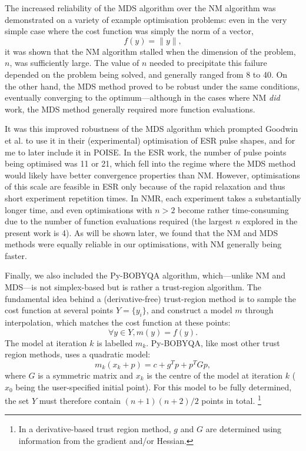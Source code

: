 The increased reliability of the MDS algorithm over the NM algorithm was demonstrated on a variety of example optimisation problems: even in the very simple case where the cost function was simply the norm of a vector,
\begin{equation}
    \label{eq:norm_cf}
    f(y) = \lVert y \rVert,
\end{equation}
it was shown that the NM algorithm stalled when the dimension of the problem, $n$, was sufficiently large.
The value of $n$ needed to precipitate this failure depended on the problem being solved, and generally ranged from 8 to 40.
On the other hand, the MDS method proved to be robust under the same conditions, eventually converging to the optimum---although in the cases where NM \textit{did} work, the MDS method generally required more function evaluations.

It was this improved robustness of the MDS algorithm which prompted Goodwin et al.\autocite{Goodwin2018JMR} to use it in their (experimental) optimisation of ESR pulse shapes, and for me to later include it in POISE.
In the ESR work, the number of pulse points being optimised was 11 or 21, which fell into the regime where the MDS method would likely have better convergence properties than NM.
However, optimisations of this scale are feasible in ESR only because of the rapid relaxation and thus short experiment repetition times.
In NMR, each experiment takes a substantially longer time, and even optimisations with $n > 2$ become rather time-consuming due to the number of function evaluations required (the largest $n$ explored in the present work is 4).
As will be shown later, we found that the NM and MDS methods were equally reliable in our optimisations, with NM generally being faster.

Finally, we also included the Py-BOBYQA algorithm\autocite{Powell2009Proc,Cartis2019ACMTMS}, which---unlike NM and MDS---is not simplex-based but is rather a trust-region algorithm.
The fundamental idea behind a (derivative-free) trust-region method is to sample the cost function at several points $Y = \{y_i\}$, and construct a model $m$ through interpolation, which matches the cost function at these points:
\begin{equation}
    \label{eq:trust_region_model}
    \forall y \in Y, m(y) = f(y).
\end{equation}
The model at iteration $k$ is labelled $m_k$.
Py-BOBYQA, like most other trust region methods, uses a quadratic model:
\begin{equation}
    \label{eq:trust_region_quadratic_model}
    m_k(x_k + p) = c + g^Tp + p^TGp,
\end{equation}
where $G$ is a symmetric matrix and $x_k$ is the centre of the model at iteration $k$ ($x_0$ being the user-specified initial point).
For this model to be fully determined, the set $Y$ must therefore contain $(n+1)(n+2)/2$ points in total.%
\footnote{In a derivative-based trust region method, $g$ and $G$ are determined using information from the gradient and/or Hessian.}

